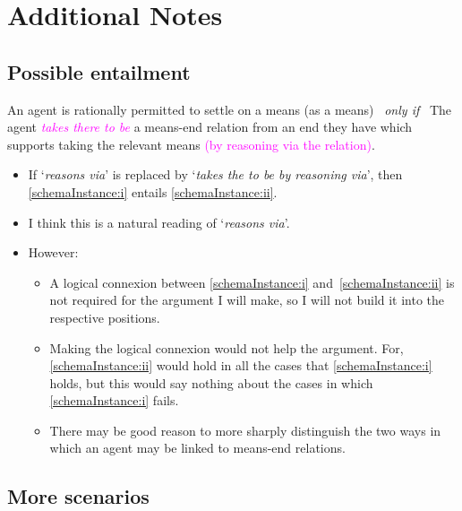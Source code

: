 \documentclass[10pt]{article}
\newenvironment{beamerblock}[1]{%
  \tcolorbox[standard,%
  no shadow,
  noparskip,
  colback=white,
  colframe=black,
  colbacktitle=white,
  coltitle=black,
  colupper=black,
  size=small,
  boxrule=.125mm,
  fonttitle=\bfseries,
  sharp corners=all,
  title=#1]}%
{\endtcolorbox}
\begin{document}
\newpage

\section{Additional Notes}
\label{sec:additional-notes}


\subsection{Possible entailment}
\label{sec:possible-entailment}

\begin{beamerblock}{Taking (by reasoning via)}
    An agent is rationally permitted to settle on a means (as a means)
    \newline
    \mbox{ }\hfill\emph{only if}\hfill\mbox{ }
    \newline
    The agent \textcolor{fuchsia}{\emph{takes there to be}} a means-end relation from an end they have which supports taking the relevant means \textcolor{fuchsia}{(by reasoning via the relation)}.
  \end{beamerblock}

\begin{itemize}
\item If `\emph{reasons via}' is replaced by `\emph{takes the to be by reasoning via}', then \ref{schemaInstance:i} entails \ref{schemaInstance:ii}.
\item I think this is a natural reading of `\emph{reasons via}'.
\item However:
  \begin{itemize}
  \item A logical connexion between \ref{schemaInstance:i} and~\ref{schemaInstance:ii} is not required for the argument I will make, so I will not build it into the respective positions.
  \item Making the logical connexion would not help the argument. For, \ref{schemaInstance:ii} would hold in all the cases that \ref{schemaInstance:i} holds, but this would say nothing about the cases in which \ref{schemaInstance:i} fails.
  \item There may be good reason to more sharply distinguish the two ways in which an agent may be linked to means-end relations.
  \end{itemize}
\end{itemize}

\subsection{More scenarios}
\label{sec:more-scenarios}
\end{document}
